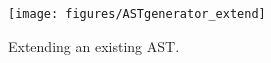 \documentclass{overturerepchap}
\begin{document}


\begin{figure}[hpt]
\centering
\texttt{[image: figures/ASTgenerator\_extend]}
\caption{Extending an existing AST.\label{fig:ASTgenExtend}}
\end{figure}

\end{document}
